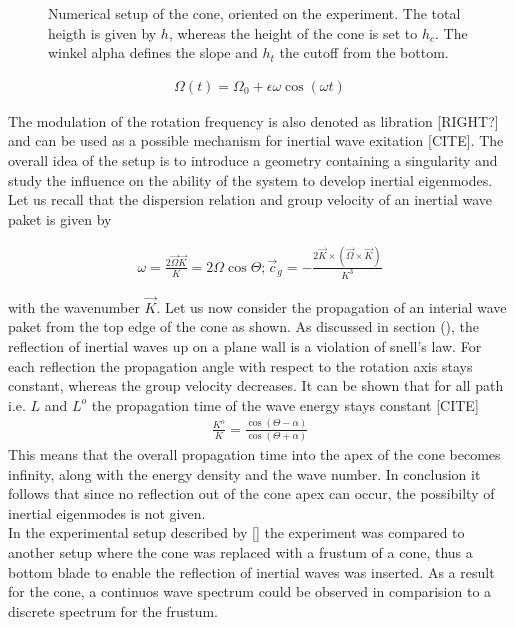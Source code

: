 \begin{figure}[!bp]
  \begin{minipage}[c]{0.6\textwidth}
      \centering
  \end{minipage}
  \begin{minipage}[c]{0.3\textwidth}
      \caption{Numerical setup of the cone, oriented on the experiment. The total heigth is given by $h$, whereas the height of the cone is set to $h_c$.
      The winkel alpha defines the slope and $h_t$ the cutoff from the bottom.}
      \label{cone:theorie}
  \end{minipage}
\end{figure}


\begin{align}
\Omega(t) = \Omega_0 + \epsilon \omega \cos(\omega t)
\end{align}

The modulation of the rotation frequency is also denoted as libration [RIGHT?] and can be used as a possible mechanism
for inertial wave exitation [CITE].
The overall idea of the setup is to introduce a geometry containing a singularity and study the influence on the ability of
the system to develop inertial eigenmodes.
Let us recall that the dispersion relation and group velocity of an inertial wave paket is given by

\begin{align}
    \omega = \frac{2\vec{\Omega}\vec{K}}{K} = 2 \Omega \cos\Theta ; \vec{c}_g = -\frac{2\vec{K}\times (\vec{\Omega} \times \vec{K})}{K^3}
\end{align}

with the wavenumber $\vec{K}$.
Let us now consider the propagation of an interial wave paket from the top edge of the cone as shown.
As discussed in section (), the reflection of inertial waves up on a  plane wall is a violation of snell's law.
For each reflection the propagation angle with respect to the rotation axis stays constant,
whereas the group velocity decreases.
It can be shown that for all path i.e. $L$ and $L^o$ the propagation time of the wave energy stays constant [CITE]
\begin{align}
    \frac{K^o}{K} = \frac{\cos(\Theta - \alpha)}{\cos(\Theta + \alpha)}
\end{align}
This means that the overall propagation time into the apex of the cone becomes infinity, along with the energy density and the wave number.
In conclusion it follows that since no reflection out of the cone apex can occur, the possibilty of inertial eigenmodes is not given.\\
In the experimental setup described by [] the experiment was compared to another setup where the cone was replaced with a frustum of a cone,
thus a bottom blade to enable the reflection of inertial waves was inserted.
As a result for the cone, a continuos wave spectrum could be observed in comparision to a discrete spectrum  for the frustum.\\

